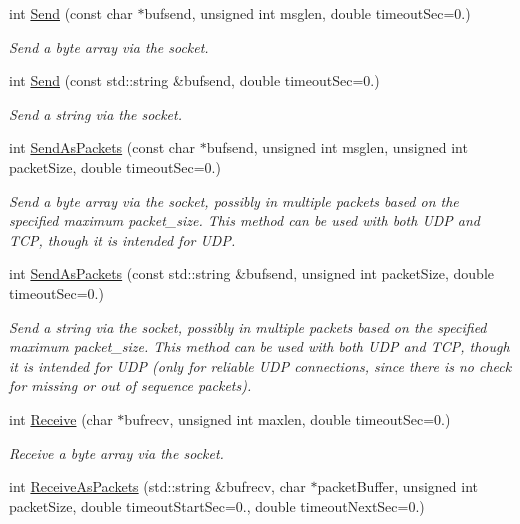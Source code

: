 \begin{DoxyCompactItemize}
int \hyperlink{classosa_socket_abf9a255ce888e52f7be1098f651acacd}{Send} (const char $\ast$bufsend, unsigned int msglen, double timeout\+Sec=0.)
\begin{DoxyCompactList}\small\item\em Send a byte array via the socket. \end{DoxyCompactList}\item 
int \hyperlink{classosa_socket_ae0e52036f8cf0a4896e1631696ab8001}{Send} (const std\+::string \&bufsend, double timeout\+Sec=0.)
\begin{DoxyCompactList}\small\item\em Send a string via the socket. \end{DoxyCompactList}\item 
int \hyperlink{classosa_socket_a734960e3f31352ecce882c55638e219b}{Send\+As\+Packets} (const char $\ast$bufsend, unsigned int msglen, unsigned int packet\+Size, double timeout\+Sec=0.)
\begin{DoxyCompactList}\small\item\em Send a byte array via the socket, possibly in multiple packets based on the specified maximum packet\+\_\+size. This method can be used with both U\+D\+P and T\+C\+P, though it is intended for U\+D\+P. \end{DoxyCompactList}\item 
int \hyperlink{classosa_socket_ac13c453c4f62e562e38a391725992232}{Send\+As\+Packets} (const std\+::string \&bufsend, unsigned int packet\+Size, double timeout\+Sec=0.)
\begin{DoxyCompactList}\small\item\em Send a string via the socket, possibly in multiple packets based on the specified maximum packet\+\_\+size. This method can be used with both U\+D\+P and T\+C\+P, though it is intended for U\+D\+P (only for reliable U\+D\+P connections, since there is no check for missing or out of sequence packets). \end{DoxyCompactList}\item 
int \hyperlink{classosa_socket_a76241adc0e7a67b5dfae17f81e2728ac}{Receive} (char $\ast$bufrecv, unsigned int maxlen, double timeout\+Sec=0.)
\begin{DoxyCompactList}\small\item\em Receive a byte array via the socket. \end{DoxyCompactList}\item 
int \hyperlink{classosa_socket_afcbcb441431d78b8887c8c6af9998f7e}{Receive\+As\+Packets} (std\+::string \&bufrecv, char $\ast$packet\+Buffer, unsigned int packet\+Size, double timeout\+Start\+Sec=0., double timeout\+Next\+Sec=0.)

\end{DoxyCompactItemize}

